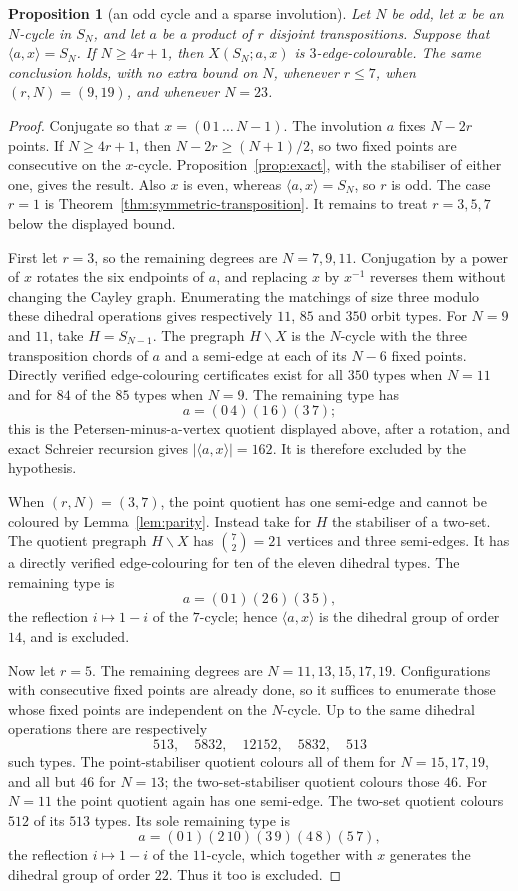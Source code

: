 \documentclass[11pt,a4paper]{article}
\newtheorem{proposition}[theorem]{Proposition}
\theoremstyle{definition}
\theoremstyle{remark}
\newcommand{\X}[3]{X(#1;#2,#3)}
\begin{document}
\begin{proposition}[an odd cycle and a sparse involution]\label{prop:sparse-involution-cycle}
Let $N$ be odd, let $x$ be an $N$-cycle in $S_N$, and let $a$ be a product of $r$ disjoint transpositions.  Suppose that $\langle a,x\rangle=S_N$.  If $N\ge4r+1$, then $\X{S_N}{a}{x}$ is $3$-edge-colourable.  The same conclusion holds, with no extra bound on $N$, whenever $r\le7$, when $(r,N)=(9,19)$, and whenever $N=23$.
\end{proposition}
\begin{proof}
Conjugate so that $x=(0\,1\,\ldots\,N-1)$.  The involution $a$ fixes $N-2r$ points.  If $N\ge4r+1$, then $N-2r\ge(N+1)/2$, so two fixed points are consecutive on the $x$-cycle.  Proposition~\ref{prop:exact}, with the stabiliser of either one, gives the result.  Also $x$ is even, whereas $\langle a,x\rangle=S_N$, so $r$ is odd.  The case $r=1$ is Theorem~\ref{thm:symmetric-transposition}.  It remains to treat $r=3,5,7$ below the displayed bound.

First let $r=3$, so the remaining degrees are $N=7,9,11$.  Conjugation by a power of $x$ rotates the six endpoints of $a$, and replacing $x$ by $x^{-1}$ reverses them without changing the Cayley graph.  Enumerating the matchings of size three modulo these dihedral operations gives respectively $11$, $85$ and $350$ orbit types.  For $N=9$ and $11$, take $H=S_{N-1}$.  The pregraph $H\backslash X$ is the $N$-cycle with the three transposition chords of $a$ and a semi-edge at each of its $N-6$ fixed points.  Directly verified edge-colouring certificates exist for all $350$ types when $N=11$ and for $84$ of the $85$ types when $N=9$.  The remaining type has
\[
 a=(0\,4)(1\,6)(3\,7);
\]
this is the Petersen-minus-a-vertex quotient displayed above, after a rotation, and exact Schreier recursion gives $|\langle a,x\rangle|=162$.  It is therefore excluded by the hypothesis.

When $(r,N)=(3,7)$, the point quotient has one semi-edge and cannot be coloured by Lemma~\ref{lem:parity}.  Instead take for $H$ the stabiliser of a two-set.  The quotient pregraph $H\backslash X$ has $\binom72=21$ vertices and three semi-edges.  It has a directly verified edge-colouring for ten of the eleven dihedral types.  The remaining type is
\[
 a=(0\,1)(2\,6)(3\,5),
\]
the reflection $i\mapsto1-i$ of the $7$-cycle; hence $\langle a,x\rangle$ is the dihedral group of order $14$, and is excluded.

Now let $r=5$.  The remaining degrees are $N=11,13,15,17,19$.  Configurations with consecutive fixed points are already done, so it suffices to enumerate those whose fixed points are independent on the $N$-cycle.  Up to the same dihedral operations there are respectively
\[
 513,\quad5832,\quad12152,\quad5832,\quad513
\]
such types.  The point-stabiliser quotient colours all of them for $N=15,17,19$, and all but $46$ for $N=13$; the two-set-stabiliser quotient colours those $46$.  For $N=11$ the point quotient again has one semi-edge.  The two-set quotient colours $512$ of its $513$ types.  Its sole remaining type is
\[
 a=(0\,1)(2\,10)(3\,9)(4\,8)(5\,7),
\]
the reflection $i\mapsto1-i$ of the $11$-cycle, which together with $x$ generates the dihedral group of order $22$.  Thus it too is excluded.


\end{proof}
\end{document}
